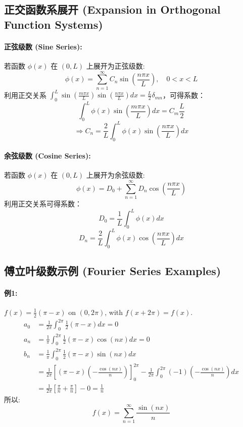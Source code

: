 \documentclass{article}
\begin{document}
	\subsection{正交函数系展开 (Expansion in Orthogonal Function Systems)}
	\paragraph{正弦级数 (Sine Series):}
	若函数 $\phi(x)$ 在 $(0, L)$ 上展开为正弦级数:
	$$ 
	\phi(x) = \sum_{n=1}^{\infty} C_n \sin\left(\frac{n\pi x}{L}\right), \quad 0 < x < L 
	$$
	利用正交关系 $\int_0^L \sin\left(\frac{m\pi x}{L}\right) \sin\left(\frac{n\pi x}{L}\right) dx = \frac{L}{2}\delta_{mn}$，可得系数：
	$$ 
	\int_0^L \phi(x) \sin\left(\frac{m\pi x}{L}\right) dx = C_m \frac{L}{2} 
	$$
	$$ 
	\Rightarrow C_n = \frac{2}{L} \int_0^L \phi(x) \sin\left(\frac{n\pi x}{L}\right) dx 
	$$
	
	\paragraph{余弦级数 (Cosine Series):}
	若函数 $\phi(x)$ 在 $(0, L)$ 上展开为余弦级数:
	$$ 
	\phi(x) = D_0 + \sum_{n=1}^{\infty} D_n \cos\left(\frac{n\pi x}{L}\right) 
	$$
	利用正交关系可得系数：
	$$ 
	D_0 = \frac{1}{L} \int_0^L \phi(x) dx 
	$$
	$$ 
	D_n = \frac{2}{L} \int_0^L \phi(x) \cos\left(\frac{n\pi x}{L}\right) dx 
	$$
	
	\subsection{傅立叶级数示例 (Fourier Series Examples)}
	\paragraph{例1:} $f(x) = \frac{1}{2}(\pi-x)$ on $(0, 2\pi)$, with $f(x+2\pi) = f(x)$.
	\begin{align*}
		a_0 &= \frac{1}{2\pi} \int_0^{2\pi} \frac{1}{2}(\pi-x) dx = 0 \\
		a_n &= \frac{1}{\pi} \int_0^{2\pi} \frac{1}{2}(\pi-x) \cos(nx) dx = 0 \\
		b_n &= \frac{1}{\pi} \int_0^{2\pi} \frac{1}{2}(\pi-x) \sin(nx) dx \\
		&= \frac{1}{2\pi} \left[ (\pi-x) \left(-\frac{\cos(nx)}{n}\right) \right]_0^{2\pi} - \frac{1}{2\pi} \int_0^{2\pi} (-1) \left(-\frac{\cos(nx)}{n}\right) dx \\
		&= \frac{1}{2\pi} \left[ \frac{\pi}{n} + \frac{\pi}{n} \right] - 0 = \frac{1}{n}
	\end{align*}
	所以:
	$$ 
	f(x) = \sum_{n=1}^{\infty} \frac{\sin(nx)}{n} 
	$$
	
\end{document}

